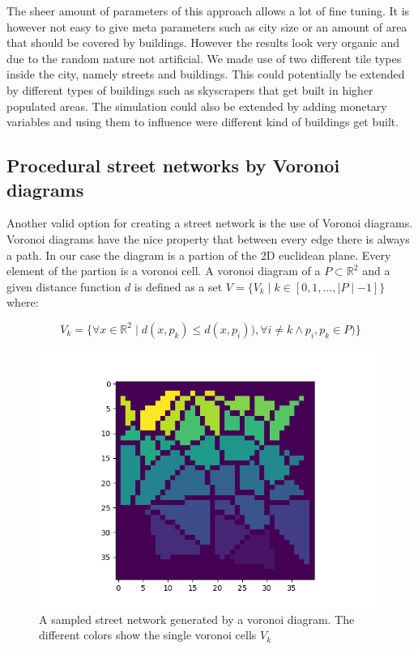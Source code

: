\documentclass{scrartcl}
\begin{document}
The sheer amount of parameters of this approach allows a lot of fine tuning.
It is however not easy to give meta parameters such as city size or an amount
of area that should be covered by buildings. However the results look very organic
and due to the random nature not artificial. We made use of two different tile types
inside the city, namely streets and buildings. This could potentially be extended
by different types of buildings such as skyscrapers that get built in higher
populated areas. The simulation could also be extended by adding monetary variables
and using them to influence were different kind of buildings get built.


\subsection{Procedural street networks by Voronoi diagrams}

Another valid option for creating a street network is the use of Voronoi diagrams.
Voronoi diagrams have the nice property that between every edge there is always a path.
In our case the diagram is a partion of the 2D euclidean plane.
Every element of the partion is a voronoi cell.
A voronoi diagram of a  $ P \subset \mathbb{R}^2 $ and a given distance 
function $d$ is defined as a set $V=\lbrace V_k \mid k \in [0,1,\ldots,\mid P\mid-1] \rbrace$ where:

\[
    V_k=\lbrace \forall x \in \mathbb{R}^2 \mid d(x,p_k) \leq d(x,p_i)), \forall i \ne k \land p_i,p_k \in P ) \rbrace
\]

\begin{figure}
    \centering
    \includegraphics[scale = 0.5]{voro}
    \caption{A sampled street network generated by a voronoi diagram.
    The different colors show the single voronoi cells $V_k$}
    \label{fig:voronoi}
\end{figure}
\end{document}
